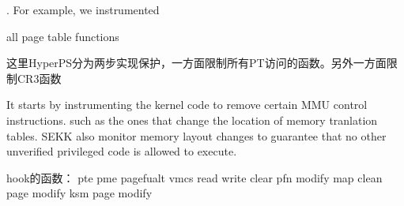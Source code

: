 . For example, we instrumented 

all page table functions 

这里HyperPS分为两步实现保护，一方面限制所有PT访问的函数。另外一方面限制CR3函数 

It starts by instrumenting the kernel code to remove certain MMU control instructions. such as the ones that change the location of memory tranlation tables. 
SEKK also monitor memory layout changes to guarantee that no other unverified privileged code is allowed to execute. 

hook的函数：
pte pme pagefualt 
vmcs read write clear 
pfn modify map 
clean page modify 
ksm page modify
\fi

